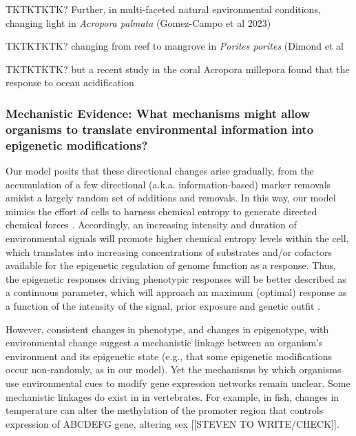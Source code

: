 \documentclass{article}
\begin{document}
TKTKTKTK? Further, in multi-faceted natural environmental conditions, changing light in \textit{Acropora palmata} (Gomez-Campo et al 2023) 

TKTKTKTK? changing from reef to mangrove in \textit{Porites porites} (Dimond et al 


TKTKTKTK? but a recent study in the coral Acropora millepora found that the response to ocean acidification



\subsubsection{Mechanistic Evidence: What mechanisms might allow organisms to translate environmental information into epigenetic modifications?}

Our model posits that these directional changes arise gradually, from the accumulation of a few directional (a.k.a. information-based) marker removals amidst a largely random set of additions and removals. In this way, our model mimics the effort of cells to harness chemical entropy to generate directed chemical forces \citep{baker2023cells}. Accordingly, an increasing intensity and duration of environmental signals will promote higher chemical entropy levels within the cell, which translates into increasing concentrations of substrates and/or cofactors available for the epigenetic regulation of genome function as a response. Thus, the epigenetic responses driving phenotypic responses will be better described as a continuous parameter, which will approach an maximum (optimal) response as a function of the intensity of the signal, prior exposure and genetic outfit \citep{hackerott2021coral}. 

However, consistent changes in phenotype, and changes in epigenotype, with environmental change suggest a mechanistic linkage between an organism's environment and its epigenetic state (e.g., that some epigenetic modifications occur non-randomly, as in our model). Yet the mechanisms by which organisms use environmental cues to modify gene expression networks remain unclear. Some mechanistic linkages do exist in in vertebrates. For example, in fish, changes in temperature can alter the methylation of the promoter region that controls expression of ABCDEFG gene, altering sex [[STEVEN TO WRITE/CHECK]]. 
\end{document}
